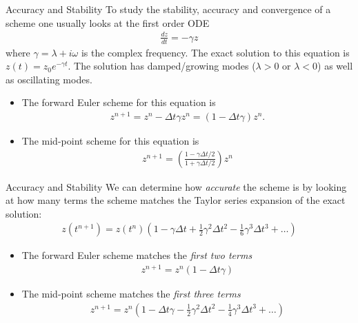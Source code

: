 \documentclass[pdf]{beamer}
\theoremstyle{definition}
\begin{document}
\begin{frame}{Accuracy and Stability}
  \small%
  To study the stability, accuracy and convergence of a scheme one usually
  looks at the first order ODE
  \begin{align*}
    \frac{dz}{dt} = -\gamma z
  \end{align*}
  where $\gamma = \lambda + i\omega$ is the complex frequency. The
  exact solution to this equation is $z(t) = z_0 e^{-\gamma t}$. The
  solution has damped/growing modes ($\lambda>0$ or $\lambda<0$) as
  well as oscillating modes.

  \begin{itemize}
    \item The forward Euler scheme for this equation is
      \begin{align*}
        z^{n+1} = z^n - \Delta t \gamma z^n = (1-\Delta t\gamma) z^n.
      \end{align*}
    \item The mid-point scheme for this equation is
      \begin{align*}
        z^{n+1} = \left(\frac{1-\gamma\Delta t/2}{1+\gamma\Delta t/2}\right) z^n
      \end{align*}
    \end{itemize}
\end{frame}

\begin{frame}{Accuracy and Stability}
  We can determine how \emph{accurate} the scheme is by looking at how
  many terms the scheme matches the Taylor series expansion of the
  exact solution:
  \begin{align*}
    z(t^{n+1}) = z(t^n)
    \left(
    1 - \gamma\Delta t + \frac{1}{2}\gamma^2 \Delta t^2 - \frac{1}{6}\gamma^3 \Delta t^3 + \ldots
    \right)
  \end{align*}

  \begin{itemize}
  \item The forward Euler scheme matches the \emph{first two terms}
    \begin{align*}
      z^{n+1} = z^n (1-\Delta t\gamma)
    \end{align*}
  \item The mid-point scheme matches the \emph{first three terms}
    \begin{align*}
      z^{n+1} = z^n \left(
      1-\Delta t\gamma - \frac{1}{2}\gamma^2 \Delta t^2  - \frac{1}{4} \gamma^3 \Delta t^3 + \ldots
      \right)
    \end{align*}
  \end{itemize}
\end{frame}
\end{document}
